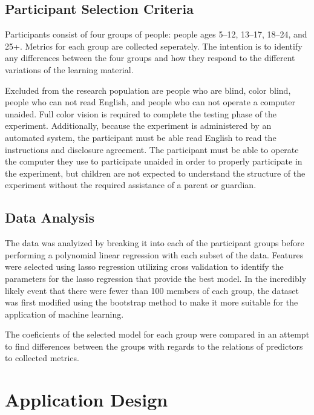 \documentclass[12pt]{report}
\begin{document}
\section{Participant Selection Criteria}

Participants consist of four groups of people: people ages 5--12, 13--17, 18--24, and 25+. Metrics for each group are collected seperately. The intention is to identify any differences between the four groups and how they respond to the different variations of the learning material.

Excluded from the research population are people who are blind, color blind, people who can not read English, and people who can not operate a computer unaided. Full color vision is required to complete the testing phase of the experiment. Additionally, because the experiment is administered by an automated system, the participant must be able read English to read the instructions and disclosure agreement. The participant must be able to operate the computer they use to participate unaided in order to properly participate in the experiment, but children are not expected to understand the structure of the experiment without the required assistance of a parent or guardian.

\section{Data Analysis}

The data was analyized by breaking it into each of the participant groups before performing a polynomial linear regression with each subset of the data. Features were selected using lasso regression utilizing cross validation to identify the parameters for the lasso regression that provide the best model. In the incredibly likely event that there were fewer than 100 members of each group, the dataset was first modified using the bootstrap method to make it more suitable for the application of machine learning.

The coeficients of the selected model for each group were compared in an attempt to find differences between the groups with regards to the relations of predictors to collected metrics.

\chapter{Application Design}
\end{document}
